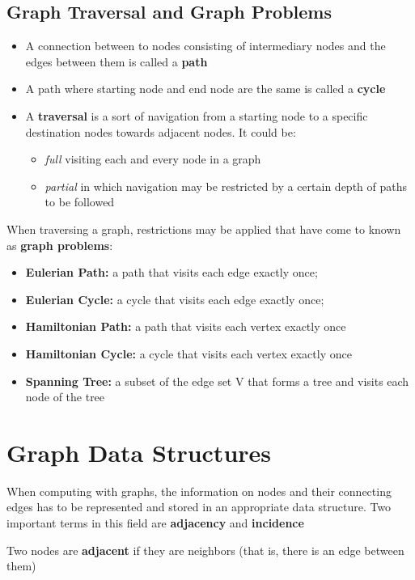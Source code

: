 \subsection{Graph Traversal and Graph Problems}
\begin{itemize}
    \item A connection between to nodes consisting of intermediary nodes and the edges between them is called a \textbf{path}
    \item A path where starting node and end node are the same is called a \textbf{cycle}
    \item A \textbf{traversal} is a sort of navigation from a starting node to a specific destination nodes towards adjacent nodes. It could be:
    \begin{itemize}
        \item \textit{full} visiting each and every node in a graph
        \item \textit{partial} in which navigation may be restricted by a certain depth of paths to be followed
    \end{itemize}
\end{itemize}
When traversing a graph, restrictions may be applied that have come to known as \textbf{graph problems}:
\begin{itemize}
    \item \textbf{Eulerian Path:} a path that visits each edge exactly once;
    \item \textbf{Eulerian Cycle:} a cycle that visits each edge exactly once;
    \item \textbf{Hamiltonian Path:} a path that visits each vertex exactly once
    \item \textbf{Hamiltonian Cycle:} a cycle that visits each vertex exactly once
    \item \textbf{Spanning Tree:} a subset of the edge set V that forms a tree and visits each node of the tree
\end{itemize}

\section{Graph Data Structures}
When computing with graphs, the information on nodes and their connecting edges has to be represented and stored in an appropriate data structure. Two important terms in this field are \textbf{adjacency} and \textbf{incidence}
\begin{tcolorbox}
Two nodes are \textbf{adjacent} if they are neighbors (that is, there is an edge between them)
\end{tcolorbox}

